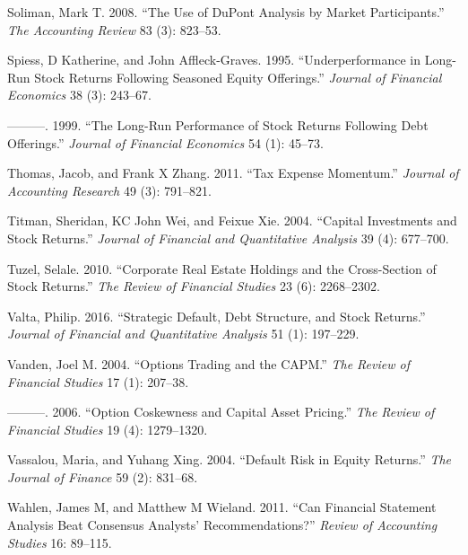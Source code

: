 \documentclass[
  letterpaper,
  DIV=11,
  numbers=noendperiod]{scrreprt}
\newlength{\cslhangindent}
\newlength{\cslentryspacingunit} %
\newenvironment{CSLReferences}[2] %
 {%
  \setlength{\parindent}{0pt}
  \ifodd #1
  \let\oldpar\par
  \def\par{\hangindent=\cslhangindent\oldpar}
  \fi
  \setlength{\parskip}{#2\cslentryspacingunit}
 }%
 {}
\begin{document}
\begin{CSLReferences}{1}{0}
\leavevmode{}%
Soliman, Mark T. 2008. {``The Use of DuPont Analysis by Market
Participants.''} \emph{The Accounting Review} 83 (3): 823--53.

\leavevmode{}%
Spiess, D Katherine, and John Affleck-Graves. 1995. {``Underperformance
in Long-Run Stock Returns Following Seasoned Equity Offerings.''}
\emph{Journal of Financial Economics} 38 (3): 243--67.

\leavevmode{}%
---------. 1999. {``The Long-Run Performance of Stock Returns Following
Debt Offerings.''} \emph{Journal of Financial Economics} 54 (1): 45--73.

\leavevmode{}%
Thomas, Jacob, and Frank X Zhang. 2011. {``Tax Expense Momentum.''}
\emph{Journal of Accounting Research} 49 (3): 791--821.

\leavevmode{}%
Titman, Sheridan, KC John Wei, and Feixue Xie. 2004. {``Capital
Investments and Stock Returns.''} \emph{Journal of Financial and
Quantitative Analysis} 39 (4): 677--700.

\leavevmode{}%
Tuzel, Selale. 2010. {``Corporate Real Estate Holdings and the
Cross-Section of Stock Returns.''} \emph{The Review of Financial
Studies} 23 (6): 2268--2302.

\leavevmode{}%
Valta, Philip. 2016. {``Strategic Default, Debt Structure, and Stock
Returns.''} \emph{Journal of Financial and Quantitative Analysis} 51
(1): 197--229.

\leavevmode{}%
Vanden, Joel M. 2004. {``Options Trading and the CAPM.''} \emph{The
Review of Financial Studies} 17 (1): 207--38.

\leavevmode{}%
---------. 2006. {``Option Coskewness and Capital Asset Pricing.''}
\emph{The Review of Financial Studies} 19 (4): 1279--1320.

\leavevmode{}%
Vassalou, Maria, and Yuhang Xing. 2004. {``Default Risk in Equity
Returns.''} \emph{The Journal of Finance} 59 (2): 831--68.

\leavevmode{}%
Wahlen, James M, and Matthew M Wieland. 2011. {``Can Financial Statement
Analysis Beat Consensus Analysts' Recommendations?''} \emph{Review of
Accounting Studies} 16: 89--115.


\end{CSLReferences}
\end{document}
